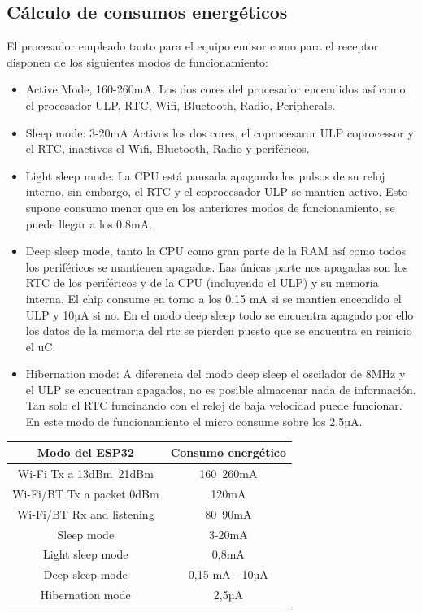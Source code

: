 \documentclass[paper=a4, fontsize=11pt,twoside]{scrartcl}	%
\begin{document}
    \subsection{Cálculo de consumos energéticos}
            El procesador empleado tanto para el equipo emisor como para el receptor disponen de los siguientes modos de funcionamiento:
            \begin{itemize}
                \item  Active Mode, 160-260mA.  Los dos cores del procesador encendidos así como el procesador ULP,
                RTC, Wifi, Bluetooth, Radio, Peripherals.
                \item  Sleep mode: 3-20mA Activos los dos cores, el coprocesaror ULP coprocessor y el RTC, inactivos el 
                Wifi, Bluetooth, Radio y periféricos.
                \item  Light sleep mode: La CPU está pausada apagando los pulsos de su reloj interno, sin embargo, el RTC
                y el coprocesador ULP se mantien activo. Esto supone consumo menor que en los anteriores modos de funcionamiento,
                se puede llegar a los 0.8mA.
                \item Deep sleep mode, tanto la CPU como gran parte de la RAM así como todos los periféricos se mantienen 
                apagados. Las únicas parte nos apagadas son los RTC de los periféricos y de la CPU (incluyendo el ULP) y su
                memoria interna. El chip consume en torno a los 0.15 mA si se mantien encendido el ULP y  10µA si no.
                En el modo deep sleep todo se encuentra apagado por ello los datos de la memoria del rtc se pierden
                puesto que se encuentra en reinicio el uC.
                \item Hibernation mode: A diferencia del modo deep sleep el oscilador de 8MHz y el ULP se encuentran apagados,
                no es posible almacenar nada de información. Tan solo el RTC funcinando con el reloj de baja velocidad puede funcionar.
                En este modo de funcionamiento el micro consume sobre los 2.5µA.
            \end{itemize}
            \begin{center}
                \begin{tabular}{||c || c ||} 
                \hline
                Modo del ESP32  & Consumo energético  \\ [0.5ex] 
                \hline
                Wi-Fi Tx a 13dBm~21dBm & 160~260mA  \\ 
                Wi-Fi/BT Tx  a packet 0dBm	 & 120mA  \\
                Wi-Fi/BT Rx and listening & 80~90mA  \\
                Sleep mode &  3-20mA   \\
                Light sleep mode &0,8mA  \\
                Deep sleep mode &   0,15 mA - 10µA  \\
                Hibernation mode & 2,5µA  \\
                \hline
                \end{tabular}
            \end{center}
\end{document}
